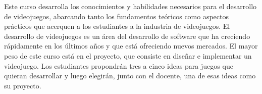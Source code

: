 \documentclass{article}
\begin{document}
Este curso desarrolla los conocimientos y habilidades necesarios para el desarrollo de videojuegos, abarcando tanto los fundamentos te\'{o}ricos como aspectos pr\'{a}cticos que acerquen a los estudiantes a la industria de videojuegos. El desarrollo de videojuegos es un \'{a}rea del desarrollo de software que ha creciendo r\'{a}pidamente en los \'{u}ltimos a\~{n}os y que est\'{a} ofreciendo nuevos mercados. El mayor peso de este curso est\'{a} en el proyecto, que consiste en dise\~{n}ar e implementar un videojuego. Los estudiantes propondr\'{a}n tres a cinco ideas para juegos que quieran desarrollar y luego elegir\'{a}n, junto con el docente, una de esas ideas como su proyecto.
\end{document}

